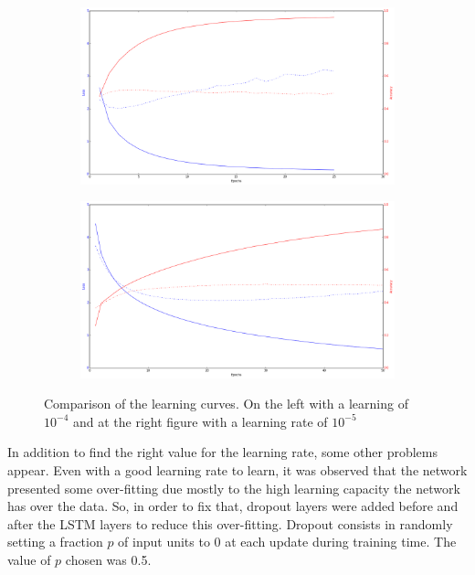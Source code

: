 \begin{figure}[H]
\centering
\begin{subfigure}[b]{.5\textwidth}
  \centering
  \includegraphics[width=1\linewidth]{img/methodology/training_bad}
\end{subfigure}%
\begin{subfigure}[b]{.5\textwidth}
  \centering
  \includegraphics[width=1\linewidth]{img/methodology/training_good}
\end{subfigure}
\caption{Comparison of the learning curves. On the left with a learning of $10^{-4}$ and at the right figure with a learning rate of $10^{-5}$}
\label{fig:training_curves_comparison}
\end{figure}

In addition to find the right value for the learning rate, some other problems appear. Even with a good learning rate to learn, it was observed that the network presented some over-fitting due mostly to the high learning capacity the network has over the data. So, in order to fix that, dropout\cite{srivastava2014dropout} layers were added before and after the LSTM layers to reduce this over-fitting. Dropout consists in randomly setting a fraction $p$ of input units to 0 at each update during training time. The value of $p$ chosen was 0.5.

